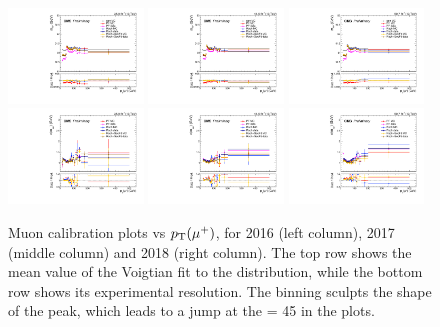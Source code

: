 \begin{figure}[!htb]
      \centering
      \captionsetup{justification=justified}
      \includegraphics[width=0.32\textwidth]{pics/muon_corr/muon_cal/2016/muP_pt_summary_mean.pdf}
      \includegraphics[width=0.32\textwidth]{pics/muon_corr/muon_cal/2017/muP_pt_summary_mean.pdf}
      \includegraphics[width=0.32\textwidth]{pics/muon_corr/muon_cal/2018/muP_pt_summary_mean.pdf}
      \includegraphics[width=0.32\textwidth]{pics/muon_corr/muon_cal/2016/muP_pt_summary_reso.pdf}
      \includegraphics[width=0.32\textwidth]{pics/muon_corr/muon_cal/2017/muP_pt_summary_reso.pdf}
      \includegraphics[width=0.32\textwidth]{pics/muon_corr/muon_cal/2018/muP_pt_summary_reso.pdf}
      \caption{Muon calibration plots vs $p_{\mathrm{T}}(\mu^{+})$, for 2016 (left column), 2017 (middle column) and 2018 (right column).
               The top row shows the mean value of the Voigtian fit to the \mmm distribution, 
               while the bottom row shows its experimental resolution.
               The \pt binning sculpts the shape of the \mmm peak, which leads to a jump at the \pt = 45 \GeV in the plots.}
      \label{fig:mucal_muP_pt}
\end{figure}


